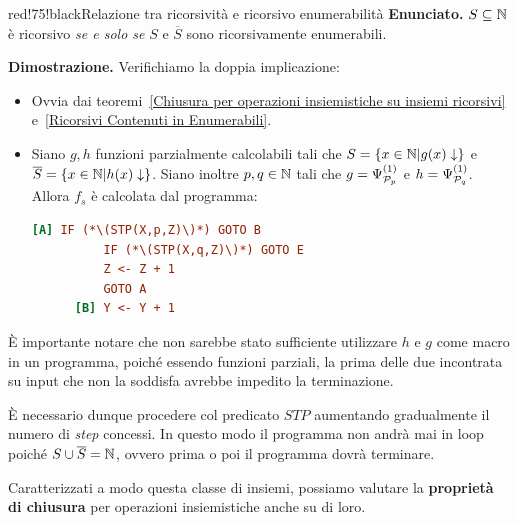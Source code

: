 \begin{halfframedbox}{red!75!black}{Relazione tra ricorsività e ricorsivo enumerabilità}\label{Relazione tra ricorsività e ricorsivo enumerabilità}
  \textbf{Enunciato. } \(S \subseteq \mathbb{N}\) è ricorsivo \textit{se e solo se} \(S\) e \(\overline{S}\) sono ricorsivamente enumerabili.
  \begin{center}
    \textcolor{red!75!black}{\hdashrule[0.5ex]{18cm}{1pt}{3mm 3pt 1mm 2pt}}
  \end{center}
  \textbf{Dimostrazione. } Verifichiamo la doppia implicazione:
  \begin{itemize}
    \item [\(\Longrightarrow\)] Ovvia dai teoremi~\ref{Chiusura per operazioni insiemistiche su insiemi ricorsivi} e~\ref{Ricorsivi Contenuti in Enumerabili}.
    \item [\(\Longleftarrow\)] Siano \(g,h\) funzioni parzialmente calcolabili tali che \(S=\displaystyle{\left\{{x \in \mathbb{N}\vert g(x) \downarrow}\right\}}\) e \(\overline{S}=\displaystyle{\left\{{x \in \mathbb{N}\vert h(x) \downarrow}\right\}}\). Siano inoltre \(p,q\in\mathbb{N}\) tali che \(g=\Psi_{\mathcal{P}_p}^{(1)}\) e \(h=\Psi_{\mathcal{P}_q}^{(1)}\). Allora \(f_s\) è calcolata dal programma:
    \begin{lstlisting}[language=ini, caption={ }]
      [A] IF (*\(STP(X,p,Z)\)*) GOTO B
          IF (*\(STP(X,q,Z)\)*) GOTO E
          Z <- Z + 1
          GOTO A
      [B] Y <- Y + 1
    \end{lstlisting}
  \end{itemize}
  È importante notare che non sarebbe stato sufficiente utilizzare \(h\) e \(g\) come macro in un programma, poiché essendo funzioni parziali, la prima delle due incontrata su input che non la soddisfa avrebbe impedito la terminazione.

  È necessario dunque procedere col predicato \(STP\) aumentando gradualmente il numero di \textit{step} concessi. In questo modo il programma non andrà mai in loop poiché \(S \cup \overline{S}=\mathbb{N}\), ovvero prima o poi il programma dovrà terminare.
\end{halfframedbox}

Caratterizzati a modo questa classe di insiemi, possiamo valutare la \textbf{proprietà di chiusura} per operazioni insiemistiche anche su di loro.

